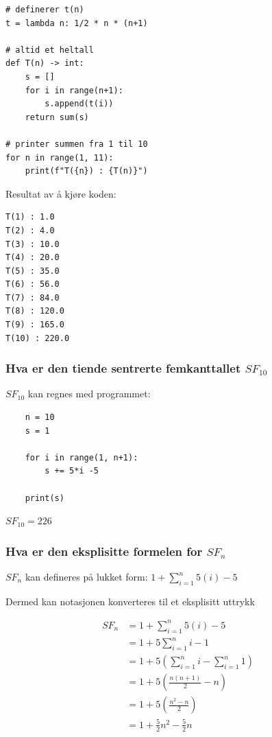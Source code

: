\documentclass{article}
\begin{document}
\begin{verbatim}
# definerer t(n)
t = lambda n: 1/2 * n * (n+1)

# altid et heltall
def T(n) -> int:
    s = []
    for i in range(n+1):
        s.append(t(i))
    return sum(s)

# printer summen fra 1 til 10
for n in range(1, 11):
    print(f"T({n}) : {T(n)}")
\end{verbatim}

Resultat av å kjøre koden:

\begin{verbatim}
T(1) : 1.0
T(2) : 4.0
T(3) : 10.0
T(4) : 20.0
T(5) : 35.0
T(6) : 56.0
T(7) : 84.0
T(8) : 120.0
T(9) : 165.0
T(10) : 220.0
\end{verbatim}

\subsubsection{Hva er den tiende sentrerte femkanttallet $SF_{10}$}

$SF_{10}$ kan regnes med programmet:

\begin{verbatim}
    n = 10
    s = 1

    for i in range(1, n+1):
        s += 5*i -5

    print(s)
\end{verbatim}

$SF_{10} = 226$

\subsubsection{Hva er den eksplisitte formelen for $SF_n$}

$SF_n$ kan defineres på lukket form:  $1 + \sum_{i=1}^{n} 5(i)-5$

Dermed kan notasjonen konverteres til et eksplisitt uttrykk

\begin{align*}
    SF_n &= 1 +\sum_{i=1}^{n} 5(i)-5 \\ 
    &=  1 +5 \sum_{i=1}^{n} i-1 \\ 
    &=  1 +5 ( \sum_{i=1}^{n} i - \sum_{i=1}^{n} 1 ) \\
    &=  1 +5 ( \frac{n(n+1)}{2} - {n} ) \\
    &=  1 +5 ( \frac{n^2-n}{2} ) \\
    &=  1 +\frac{5}{2} n^2- \frac{5}{2}n
\end{align*}
\end{document}
